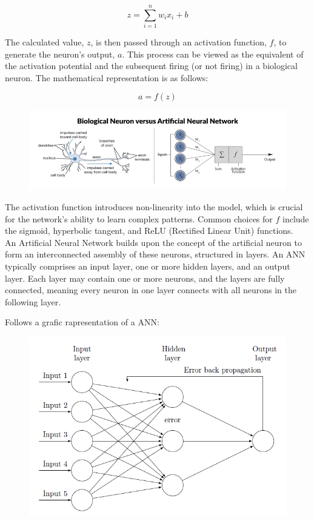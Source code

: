 \[
z = \sum_{i=1}^{n} w_i x_i + b 
\]

The calculated value, $ z $, is then passed through an activation function, $ f $, to generate the neuron's output, $ a $. This process can be viewed as the equivalent of the activation potential and the subsequent firing (or not firing) in a biological neuron. The mathematical representation is as follows:

\[
a = f(z)
\]



\begin{figure}[h!]
	\centering
	\includegraphics[width=0.8\linewidth]{Images/nn_neuron}
	\caption{}
	\label{fig:nn_neuron}
\end{figure}

The activation function introduces non-linearity into the model, which is crucial for the network's ability to learn complex patterns. Common choices for $ f $ include the sigmoid, hyperbolic tangent, and ReLU (Rectified Linear Unit) functions.\\

An Artificial Neural Network builds upon the concept of the artificial neuron to form an interconnected assembly of these neurons, structured in layers. An ANN typically comprises an input layer, one or more hidden layers, and an output layer. Each layer may contain one or more neurons, and the layers are fully connected, meaning every neuron in one layer connects with all neurons in the following layer.

Follows a grafic rapresentation of a ANN:
\begin{figure}[h!]
	\centering
	\includegraphics[width=0.7\linewidth]{Images/fig_neural_network}
	\caption{}
	\label{fig:Fig_nn}
\end{figure}


